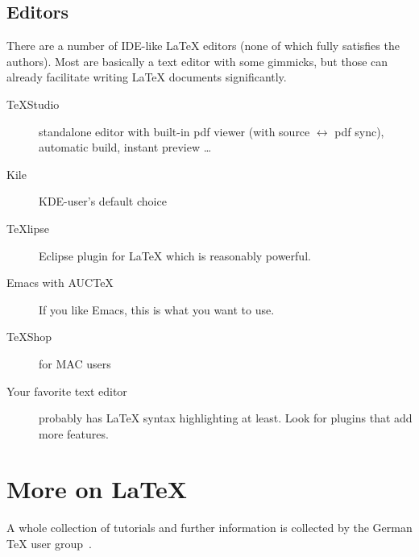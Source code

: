 \documentclass[]{rptuseminar}
\begin{document}
\subsection{Editors}
\label{sec:editors}

There are a number of IDE-like \LaTeX{} editors (none of which fully satisfies the authors).
Most are basically a text editor with some gimmicks, but those can already facilitate writing \LaTeX{} documents significantly.
\begin{description}
	\item[TeXStudio] standalone editor with built-in pdf viewer
	(with source $\leftrightarrow$ pdf sync), automatic build, instant preview \dots
	\item[Kile] KDE-user's default choice
	\item[TeXlipse] Eclipse plugin for \LaTeX{} which is reasonably powerful.
	\item[Emacs with AUCTeX] If you like Emacs, this is what you want to use.
	\item[TeXShop] for MAC users
	\item[Your favorite text editor] probably has \LaTeX{} syntax highlighting at least.
	  Look for plugins that add more features.
\end{description}

\section{More on \LaTeX}
A whole collection of tutorials and further information is collected by the German \TeX{} user group~\cite{danteintro}.
\end{document}
